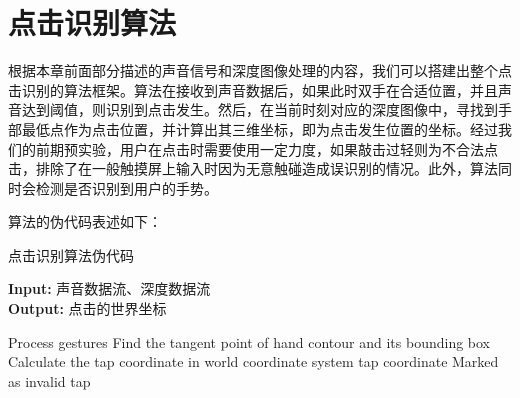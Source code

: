 \section{点击识别算法}
根据本章前面部分描述的声音信号和深度图像处理的内容，我们可以搭建出整个点击识别的算法框架。算法在接收到声音数据后，如果此时双手在合适位置，并且声音达到阈值，则识别到点击发生。然后，在当前时刻对应的深度图像中，寻找到手部最低点作为点击位置，并计算出其三维坐标，即为点击发生位置的坐标。经过我们的前期预实验，用户在点击时需要使用一定力度，如果敲击过轻则为不合法点击，排除了在一般触摸屏上输入时因为无意触碰造成误识别的情况。此外，算法同时会检测是否识别到用户的手势。

算法的伪代码表述如下：
\begin{algorithm}[h]
  \caption{点击识别算法伪代码} %
  \hspace*{0.02in} {\bf Input:} %
  声音数据流、深度数据流\\
  \hspace*{0.02in} {\bf Output:} %
  点击的世界坐标
  \begin{algorithmic}[1]
        \State Process gestures
      \Else
        \State Find the tangent point of hand contour and its bounding box
        \State Calculate the tap coordinate in world coordinate system
        \State \Return tap coordinate
      \EndIf
    \Else 
      \State Marked as invalid tap 
      \State \Return
    \EndIf
  \EndIf
  \end{algorithmic}
\end{algorithm}